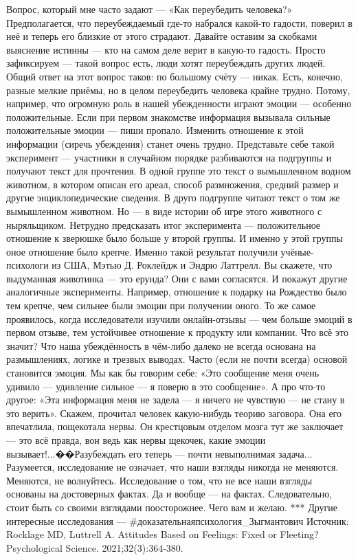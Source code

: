 Вопрос, который мне часто задают — «Как переубедить человека?»
Предполагается, что переубеждаемый где-то набрался какой-то гадости, поверил в неё и теперь его близкие от этого страдают. Давайте оставим за скобками выяснение истинны — кто на самом деле верит в какую-то гадость. Просто зафиксируем — такой вопрос есть, люди хотят переубеждать других людей.
Общий ответ на этот вопрос таков: по большому счёту — никак. Есть, конечно, разные мелкие приёмы, но в целом переубедить человека крайне трудно.
Потому, например, что огромную роль в нашей убежденности играют эмоции — особенно положительные. Если при первом знакомстве информация вызывала сильные положительные эмоции — пиши пропало. Изменить отношение к этой информации (сиречь убеждения) станет очень трудно.
Представьте себе такой эксперимент — участники в случайном порядке разбиваются на подгруппы и получают текст для прочтения. В одной группе это текст о вымышленном водном животном, в котором описан его ареал, способ размножения, средний размер и другие энциклопедические сведения.
В друго подгруппе читают текст о том же вымышленном животном. Но — в виде истории об игре этого животного с ныряльщиком.
Нетрудно предсказать итог эксперимента — положительное отношение к зверюшке было больше у второй группы. И именно у этой группы оное отношение было крепче.
Именно такой результат получили учёные-психологи из США, Мэтью Д. Роклейдж и Эндрю Латтрелл.
Вы скажете, что выдуманная животинка — это ерунда? Они с вами согласятся. И покажут другие аналогичные эксперименты.
Например, отношение к подарку на Рождество было тем крепче, чем сильнее были эмоции при получении оного.
То же самое проявилось, когда исследователи изучили онлайн-отзывы — чем больше эмоций в первом отзыве, тем устойчивее отношение к продукту или компании.
Что всё это значит? Что наша убеждённость в чём-либо далеко не всегда основана на размышлениях, логике и трезвых выводах.
Часто (если не почти всегда) основой становится эмоция. Мы как бы говорим себе: «Это сообщение меня очень удивило — удивление сильное — я поверю в это сообщение». А про что-то другое: «Эта информация меня не задела — я ничего не чувствую — не стану в это верить». 
Скажем, прочитал человек какую-нибудь теорию заговора. Она его впечатлила, пощекотала нервы. Он крестцовым отделом мозга тут же заключает — это всё правда, вон ведь как нервы щекочек, какие эмоции вызывает!...��Разубеждать его теперь — почти невыполнимая задача...
Разумеется, исследование не означает, что наши взгляды никогда не меняются. Меняются, не волнуйтесь. Исследование о том, что не все наши взгляды основаны на достоверных фактах. Да и вообще — на фактах.
Следовательно, стоит быть со своими взглядами поосторожнее. Чего вам и желаю.
***
Другие интересные исследования — #доказательнаяпсихология_Зыгмантович
Источник: Rocklage MD, Luttrell A. Attitudes Based on Feelings: Fixed or Fleeting? Psychological Science. 2021;32(3):364-380.
